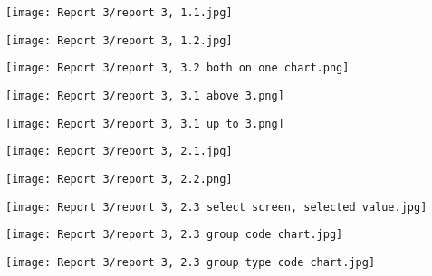 \begin{center}
  \texttt{[image: Report 3/report 3, 1.1.jpg]}
\end{center}



\begin{center}
  \texttt{[image: Report 3/report 3, 1.2.jpg]}
\end{center}


\begin{center}
  \texttt{[image: Report 3/report 3, 3.2 both on one chart.png]}
\end{center}


\begin{center}
  \texttt{[image: Report 3/report 3, 3.1 above 3.png]}
\end{center}


\begin{center}
  \texttt{[image: Report 3/report 3, 3.1 up to 3.png]}
\end{center}


\begin{center}
  \texttt{[image: Report 3/report 3, 2.1.jpg]}
\end{center}

\begin{center}
  \texttt{[image: Report 3/report 3, 2.2.png]}
\end{center}

\begin{center}
  \texttt{[image: Report 3/report 3, 2.3 select screen, selected value.jpg]}
\end{center}


\begin{center}
  \texttt{[image: Report 3/report 3, 2.3 group code chart.jpg]}
\end{center}


\begin{center}
  \texttt{[image: Report 3/report 3, 2.3 group type code chart.jpg]}
\end{center}



